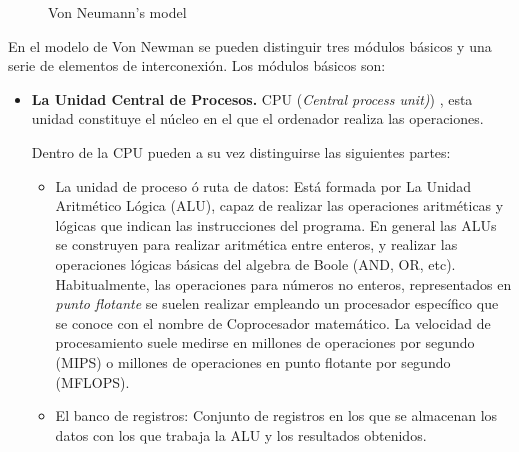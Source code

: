 \begin{paracol}{2}
\begin{figure}[ht]
	\caption{Von Neumann's model}
	\label{fig:vonne}
\end{figure}

\switchcolumn
En el modelo de Von Newman se pueden  distinguir tres módulos básicos y una serie de elementos de interconexión.  Los módulos básicos son: 

\begin{itemize}
\item \textbf{La Unidad Central de Procesos.} CPU  (\emph{Central process unit)}) , esta unidad constituye el núcleo en el que el ordenador realiza las operaciones. 

Dentro de la CPU pueden a su vez distinguirse las siguientes partes:

\begin{itemize}

\item La unidad de proceso ó ruta de datos: Está formada por La Unidad Aritmético Lógica (ALU),  capaz de realizar las operaciones aritméticas y lógicas que indican las instrucciones del programa. En general las ALUs se construyen para realizar aritmética entre enteros, y realizar las operaciones lógicas básicas del algebra de Boole (AND, OR, etc). Habitualmente, las operaciones para números no enteros, representados en \emph{punto flotante} se suelen realizar empleando un procesador específico que se conoce con el nombre de Coprocesador matemático. La velocidad de procesamiento suele medirse en millones de operaciones por segundo (MIPS) o millones de operaciones en punto flotante por segundo (MFLOPS).

\item El banco de registros: Conjunto de registros en los que se almacenan los datos con los que trabaja la ALU y los resultados obtenidos.
 

\end{itemize}
\end{itemize}
\end{paracol}
